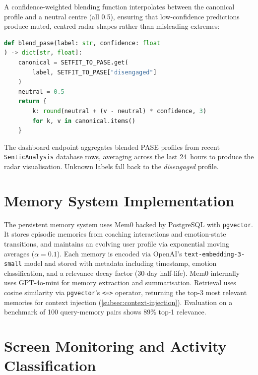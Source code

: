 A confidence-weighted blending function interpolates between the canonical profile and a neutral centre (all 0.5), ensuring that low-confidence predictions produce muted, centred radar shapes rather than misleading extremes:

\begin{lstlisting}[language=Python, caption={Confidence-weighted PASE blending function.}, label={lst:blend-pase}]
def blend_pase(label: str, confidence: float
) -> dict[str, float]:
    canonical = SETFIT_TO_PASE.get(
        label, SETFIT_TO_PASE["disengaged"]
    )
    neutral = 0.5
    return {
        k: round(neutral + (v - neutral) * confidence, 3)
        for k, v in canonical.items()
    }
\end{lstlisting}

The dashboard endpoint aggregates blended PASE profiles from recent \texttt{SenticAnalysis} database rows, averaging across the last 24~hours to produce the radar visualisation. Unknown labels fall back to the \emph{disengaged} profile.

\section{Memory System Implementation}
\label{sec:memory-system}

The persistent memory system uses Mem0 \cite{chhikara2025} backed by PostgreSQL with \texttt{pgvector}. It stores episodic memories from coaching interactions and emotion-state transitions, and maintains an evolving user profile via exponential moving averages ($\alpha = 0.1$). Each memory is encoded via OpenAI's \texttt{text-embedding-3-small} model and stored with metadata including timestamp, emotion classification, and a relevance decay factor (30-day half-life). Mem0 internally uses GPT-4o-mini for memory extraction and summarisation. Retrieval uses cosine similarity via \texttt{pgvector}'s \texttt{<=>} operator, returning the top-3 most relevant memories for context injection (\cref{subsec:context-injection}). Evaluation on a benchmark of 100 query-memory pairs shows 89\% top-1 relevance.

\section{Screen Monitoring and Activity Classification}
\label{sec:screen-monitoring}


